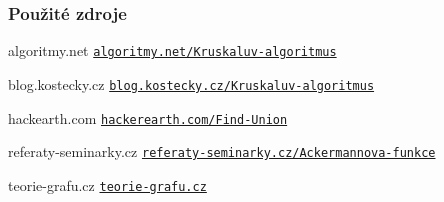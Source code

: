 \documentclass[hidelinks, 10pt, pdf, hyperref={unicode}]{beamer}
\begin{document}
    \begin{frame}
        \frametitle{Použité zdroje}
        \begin{thebibliography}{5}
             algoritmy.net
            \newblock \texttt{\href{https://www.algoritmy.net/article/1417/Kruskaluv-algoritmus}{algoritmy.net/Kruskaluv-algoritmus}}

             blog.kostecky.cz
            \newblock \texttt{\href{https://blog.kostecky.cz/2016/01/kruskaluv-algoritmus-implementace-rozbor.html}{blog.kostecky.cz/Kruskaluv-algoritmus}}
            
             hackearth.com
            \newblock \texttt{\href{https://www.hackerearth.com/practice/notes/disjoint-set-union-union-find/}{hackerearth.com/Find-Union}}

             referaty-seminarky.cz
            \newblock \texttt{\href{http://referaty-seminarky.cz/ackermannova-funkce/}{referaty-seminarky.cz/Ackermannova-funkce}}

             teorie-grafu.cz
            \newblock \texttt{\href{https://teorie-grafu.cz/}{teorie-grafu.cz}}
        \end{thebibliography}
    \end{frame}
\end{document}
